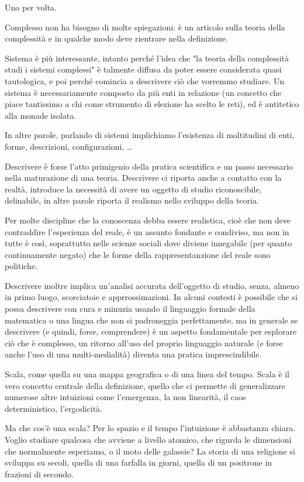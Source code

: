 \documentclass[a4paper, headings=standardclasses]{scrartcl}
\begin{document}
Uno per volta.

Complesso non ha bisogno di molte spiegazioni: è un articolo sulla teoria della complessità e in qualche modo deve rientrare nella definizione.

Sistema è più interessante, intanto perché l'idea che "la teoria della complessità studi i sistemi complessi" è talmente diffusa da poter essere considerata quasi tautologica, e poi perché comincia a descrivere ciò che vorremmo studiare.
Un sistema è necessariamente composto da più enti in relazione (un concetto che piace tantissimo a chi come strumento di elezione ha scelto le reti), ed è antitetico alla monade isolata.

In altre parole, parlando di sistemi implichiamo l'esistenza di moltitudini di enti, forme, descrizioni, configurazioni, \dots

Descrivere è forse l'atto primigenio della pratica scientifica e un passo necessario nella maturazione di una teoria. Descrivere ci riporta anche a contatto con la realtà, introduce la necessità di avere un oggetto di studio riconoscibile, delinabile, in altre parole riporta il realismo nello sviluppo della teoria.

Per molte discipline che la conoscenza debba essere realistica, cioè che non deve contraddire l'esperienza del reale, è un assunto fondante e condiviso, ma non in tutte è così, soprattutto nelle scienze sociali dove diviene innegabile (per quanto continuamente negato) che le forme della rappresentanzione del reale sono politiche.

Descrivere inoltre implica un'analisi accurata dell'oggetto di studio, senza, almeno in primo luogo, scorciatoie e apprrossimazioni. In alcuni contesti è possibile che si possa descrivere con cura e minuzia usando il linguaggio formale della matematica o una lingua che non si padroneggia perfettamente, ma in generale se descrivere (e quindi, forse, comprendere) è un aspetto fondamentale per esplorare ciò che è complesso, un ritorno all'uso del proprio linguaggio naturale (e forse anche l'uso di una multi-medialità) diventa una pratica imprescindibile.

Scala, come quella su una mappa geografica o di una linea del tempo.
Scala è il vero concetto centrale della definizione, quello che ci permette di generalizzare numerose altre intuizioni come l'emergenza, la non linearità, il caos deterministico, l'ergodicità.

Ma che cos'è una scala? Per lo spazio e il tempo l'intuizione è abbastanza chiara. Voglio studiare qualcosa che avviene a livello atomico, che rigurda le dimensioni che normalmente esperiamo, o il moto delle galassie? La storia di una religione si sviluppa su secoli, quella di una farfalla in giorni, quella di un positrone in frazioni di secondo.
\end{document}
